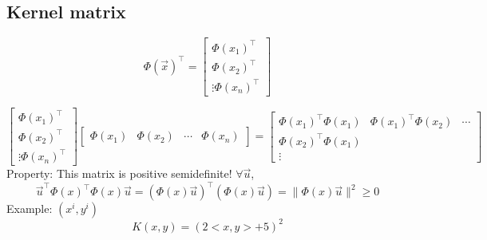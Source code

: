 \documentclass[18pt, oneside]{article}
\begin{document}
\begin{Large}
\subsection{Kernel matrix}
\begin{equation}
\Phi(\vec{x})^\top = 
\begin{bmatrix}
\Phi(x_{1})^\top\\
\Phi(x_{2})^\top\\
\vdots
\Phi(x_{n})^\top
\end{bmatrix}
\end{equation}

\begin{equation}
\begin{bmatrix}
\Phi(x_{1})^\top\\
\Phi(x_{2})^\top\\
\vdots
\Phi(x_{n})^\top
\end{bmatrix}
\begin{bmatrix}
\Phi(x_{1}) & \Phi(x_{2}) & \cdots & \Phi(x_{n})
\end{bmatrix}=
\begin{bmatrix}
\Phi(x_{1})^\top\Phi(x_{1}) & \Phi(x_{1})^\top\Phi(x_{2}) & \cdots \\
\Phi(x_{2})^\top\Phi(x_{1})\\
\vdots
\end{bmatrix}
\end{equation}
Property: This matrix is positive semidefinite! $\forall \vec{u}$, 
\begin{equation}
\vec{u}^\top\Phi(x)^\top\Phi(x)\vec{u} = (\Phi(x)\vec{u})^\top(\Phi(x)\vec{u}) = \|\Phi(x)\vec{u}\|^2 \geq 0
\end{equation}
Example: $(x^{i}, y^{i})$
\begin{equation}
K(x,y) = (2<x,y> + 5)^2
\end{equation}
\end{Large}
\end{document}
